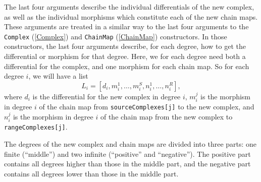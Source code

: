 \documentclass[a4paper,11pt]{report}
\begin{document}
{{{ The last four arguments describe the individual differentials of the new
complex, as well as the individual morphisms which constitute each of the new
chain maps. These arguments are treated in a similar way to the last four
arguments to the \texttt{Complex} (\ref{Complex}) and \texttt{ChainMap} (\ref{ChainMap}) constructors. In those constructors, the last four arguments describe, for
each degree, how to get the differential or morphism for that degree. Here, we
for each degree need both a differential for the complex, and one morphism for
each chain map. So for each degree $i$, we will have a list 
\[ L_i = [ d_i, m_i^1, \ldots, m_i^S, n_i^1, \ldots, n_i^R ], \]
 where $d_i$ is the differential for the new complex in degree $i$, $m_i^j$ is the morphism in degree $i$ of the chain map from \texttt{sourceComplexes[j]} to the new complex, and $n_i^j$ is the morphism in degree $i$ of the chain map from the new complex to \texttt{rangeComplexes[j]}.

 The degrees of the new complex and chain maps are divided into three parts:
one finite (``middle'') and two infinite (``positive'' and ``negative''). The positive part contains all degrees higher than those in the middle
part, and the negative part contains all degrees lower than those in the
middle part.

}}}
\end{document}
